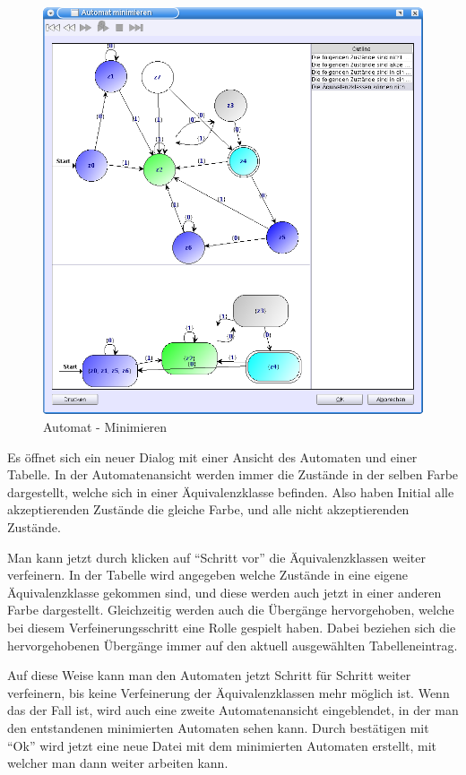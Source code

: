   \begin{figure}[h]
  \begin{center}
  \includegraphics[width=12cm]{images/minimize.png}
  \caption{Automat - Minimieren}
  \end{center}
  \end{figure}
  
  Es öffnet sich ein neuer Dialog mit einer Ansicht des Automaten und einer
  Tabelle. In der Automatenansicht werden immer die Zustände in der selben Farbe
  dargestellt, welche sich in einer Äquivalenzklasse befinden. Also haben Initial
  alle akzeptierenden Zustände die gleiche Farbe, und alle nicht akzeptierenden
  Zustände.\vspace{10pt}
  
  Man kann jetzt durch klicken auf "`Schritt vor"' die Äquivalenzklassen weiter
  verfeinern. In der Tabelle wird angegeben welche Zustände in eine eigene
  Äquivalenzklasse gekommen sind, und diese werden auch jetzt in einer anderen
  Farbe dargestellt. Gleichzeitig werden auch die Übergänge hervorgehoben, welche
  bei diesem Verfeinerungsschritt eine Rolle gespielt haben. Dabei beziehen sich
  die hervorgehobenen Übergänge immer auf den aktuell ausgewählten
  Tabelleneintrag.\vspace{10pt}
  
  Auf diese Weise kann man den Automaten jetzt Schritt für Schritt weiter
  verfeinern, bis keine Verfeinerung der Äquivalenzklassen mehr möglich ist. Wenn
  das der Fall ist, wird auch eine zweite Automatenansicht eingeblendet, in der
  man den entstandenen minimierten Automaten sehen kann. Durch bestätigen mit
  "`Ok"' wird jetzt eine neue Datei mit dem minimierten Automaten erstellt, mit
  welcher man dann weiter arbeiten kann.\vspace{10pt}
  
